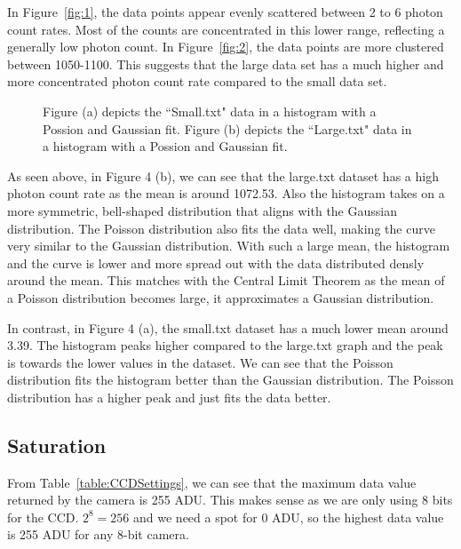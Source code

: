 \documentclass[10pt, preprint]{aastex}
\begin{document}
In Figure~\ref{fig:1}, the data points appear evenly scattered between 2 to 6 photon count rates. Most of the counts are concentrated in this lower range, reflecting a generally low photon count. In Figure~\ref{fig:2}, the data points are more clustered between 1050-1100. This suggests that the large data set has a much higher and more concentrated photon count rate compared to the small data set.

\begin{figure}[H]
  \centering
  \hfill
  \caption{\label{fig:double plot2} Figure (a) depicts the ``Small.txt" data in a histogram with a Possion and Gaussian fit. Figure (b) depicts the ``Large.txt" data in a histogram with a Possion and Gaussian fit. }
\end{figure}

As seen above, in Figure 4 (b), we can see that the large.txt dataset has a high photon count rate as the mean is around 1072.53. Also the histogram takes on a more symmetric, bell-shaped distribution that aligns with the Gaussian distribution. The Poisson distribution also fits the data well, making the curve very similar to the Gaussian distribution. With such a large mean, the histogram and the curve is lower and more spread out with the data distributed densly around the mean. This matches with the Central Limit Theorem as the mean of a Poisson distribution becomes large, it approximates a Gaussian distribution. 

In contrast, in Figure 4 (a), the small.txt dataset has a much lower mean around 3.39. The histogram peaks higher compared to the large.txt graph and the peak is towards the lower values in the dataset. We can see that the Poisson distribution fits the histogram better than the Gaussian distribution. The Poisson distribution has a higher peak and just fits the data better. 

\subsection{Saturation}

From Table~\ref{table:CCDSettings}, we can see that the maximum data value returned by the camera is 255 ADU. This makes sense as we are only using 8 bits for the CCD. $2^8 = 256$ and we need a spot for 0 ADU, so the highest data value is 255 ADU for any 8-bit camera.
\end{document}
